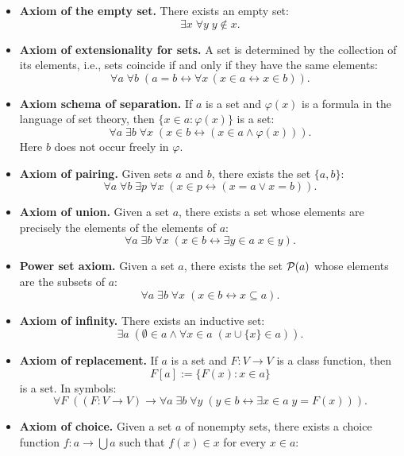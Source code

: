 \begin{itemize}
    \item[(\textnormal{NBG1})] \textbf{Axiom of the empty set.}
    There exists an empty set:
    \[\exists x\;\forall y\;y\notin x.\]
    \item[(\textnormal{NBG2})] \textbf{Axiom of extensionality for sets.}
    A set is determined by the collection of its elements, i.e., sets coincide if and only if they have the same elements:
    \[\forall a\;\forall b\;\left(a = b \leftrightarrow \forall x\,(x\in a \leftrightarrow x\in b)\right).\]
    \item[(\textnormal{NBG3})] \textbf{Axiom schema of separation.}
    If $a$ is a set and $\varphi(x)$ is a formula in the language of set theory, then $\{x\in a : \varphi(x)\}$ is a set:
    \[\forall a\;\exists b\;\forall x\;\left(x\in b \leftrightarrow (x\in a\land\varphi(x))\right).\]
    Here $b$ does not occur freely in $\varphi$.
    \item[(\textnormal{NBG4})] \textbf{Axiom of pairing.}
    Given sets $a$ and $b$, there exists the set $\{a,b\}$:
    \[\forall a\;\forall b\;\exists p\;\forall x\;\left(x\in p \leftrightarrow (x = a\lor x = b)\right).\]
    \item[(\textnormal{NBG5})] \textbf{Axiom of union.}
    Given a set $a$, there exists a set whose elements are precisely the elements of the elements of $a$:
    \[\forall a\;\exists b\;\forall x\;\left(x\in b \leftrightarrow \exists y\in a\;x\in y\right).\]
    \item[(\textnormal{NBG6})] \textbf{Power set axiom.}
    Given a set $a$, there exists the set $\mathcal{P}(a)$ whose elements are the subsets of $a$:
    \[\forall a\;\exists b\;\forall x\;\left(x\in b \leftrightarrow x\subseteq a\right).\]
    \item[(\textnormal{NBG7})] \textbf{Axiom of infinity.}
    There exists an inductive set:
    \[\exists a\;\left(\emptyset\in a\land\forall x\in a\;(x\cup\{x\}\in a)\right).\]
    \item[(\textnormal{NBG8})] \textbf{Axiom of replacement.}
    If $a$ is a set and $F : V \to V$ is a class function, then
    \[F[a] := \{F(x) : x\in a\}\]
    is a set. In symbols:
    \[\forall F\;\left((F : V \to V) \rightarrow \forall a\;\exists b\;\forall y\;(y\in b \leftrightarrow \exists x\in a\;y = F(x))\right).\]
    \item[(\textnormal{NBG9})] \textbf{Axiom of choice.}
    Given a set $a$ of nonempty sets, there exists a choice function $f : a \to \bigcup a$ such that $f(x)\in x$ for every $x\in a$:

\end{itemize}
